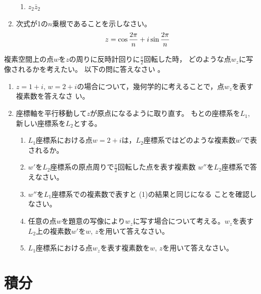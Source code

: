 \documentclass[twocolumn,11pt]{jarticle}
\begin{document}
\begin{enumerate}
\begin{enumerate}
  \item\label{eitem:z_2barz_2} $z_2\bar{z}_2$
  \end{enumerate}
\item 次式が1の$n$乗根であることを示しなさい。
  \begin{align}
    z=\cos\frac{2\pi}{n}+i\sin\frac{2\pi}{n}\notag
  \end{align}
\end{enumerate}

\nquestion
複素空間上の点$w$を$z$の周りに反時計回りに$\frac{\pi}{2}$回転した時，
どのような点$w_z$に写像されるかを考えたい。
以下の問に答えなさい
。
\begin{enumerate}
\item $z=1+i$, $w=2+i$の場合について，幾何学的に考えることで，点$w_z$を表す複素数を答えなさ
  い。
\item
  座標軸を平行移動して$z$が原点になるように取り直す。
  もとの座標系を$L_1$, 新しい座標系を$L_2$とする。
  \begin{enumerate}
    \item $L_1$座標系における点$w=2+i$は，$L_2$座標系ではどのような複素数$w'$で表されるか。
    \item $w'$を$L_2$座標系の原点周りで$\frac{\pi}{2}$回転した点を表す複素数
  $w''$を$L_2$座標系で答えなさい。
    \item $w''$を$L_1$座標系での複素数で表すと (1)の結果と同じになる
  ことを確認しなさい。
    \item 任意の点$w$を題意の写像により$w_z$に写す場合について考える。$w_z$を表す$L_2$上の複素数$w'$を$w$, $z$を用いて答えなさい。
  \item $L_1$座標系における点$w_z$を表す複素数を$w$, $z$を用いて答えなさい。
\end{enumerate}
\end{enumerate}


\newpage

\section{積分}
\end{document}
